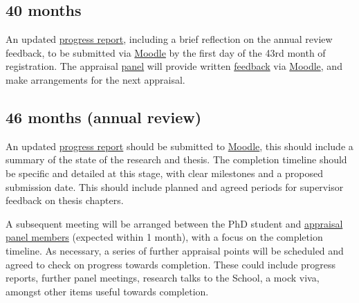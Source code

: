 \documentclass[12pt,a4paper]{article}
\begin{document}
\subsection{40 months} \label{sec:40months}
An updated \hyperref[sec:report]{progress report}, including a brief reflection on the annual review feedback, to be submitted via \href{https://modules.lancaster.ac.uk/course/view.php?id=7050}{Moodle}  by the first day of the 43rd month of registration. The appraisal \hyperref[sec:panel]{panel} will provide written \hyperref[sec:feedback]{feedback} via \href{https://modules.lancaster.ac.uk/course/view.php?id=7050}{Moodle}, and make arrangements for the next appraisal.


\subsection{46 months (annual review)} \label{sec:46months}
An updated \hyperref[sec:report]{progress report} should be submitted to \href{https://modules.lancaster.ac.uk/course/view.php?id=7050}{Moodle}, this should include a summary of the state of the research and thesis. The completion timeline should be specific and detailed at this stage, with clear milestones and a proposed submission date. This should include planned and agreed periods for supervisor feedback on thesis chapters.

A subsequent meeting will be arranged between the PhD student and \hyperref[sec:panel]{appraisal panel members} (expected within 1 month), with a focus on the completion timeline. As necessary, a series of further appraisal points will be scheduled and agreed to check on progress towards completion. These could include progress reports, further panel meetings, research talks to the School, a mock viva, amongst other items useful towards completion.
\end{document}

